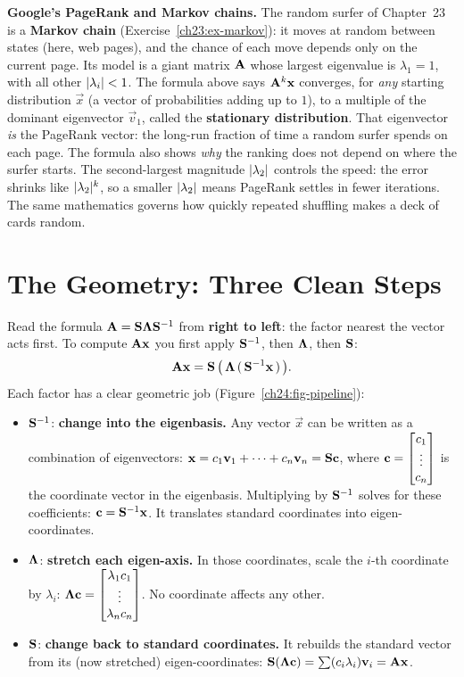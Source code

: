 \begin{applicationbox}
\textbf{Google's PageRank and Markov chains.} The random surfer of Chapter~23
is a \textbf{Markov chain} (Exercise~\ref{ch23:ex-markov}): it moves at random
between states (here, web pages), and the chance of each move depends only on the
current page. Its model is a giant matrix $\mathbf{A}$ whose largest eigenvalue is
$\lambda_1 = 1$, with all other $\lvert\lambda_i\rvert < 1$. The formula above says
$\mathbf{A}^k\mathbf{x}$ converges, for \emph{any} starting distribution $\vec{x}$
(a vector of probabilities adding up to $1$), to a multiple of the dominant
eigenvector $\vec{v}_1$, called the \textbf{stationary distribution}. That
eigenvector \emph{is} the PageRank vector: the long-run fraction of time a
random surfer spends on each page. The formula also shows \emph{why} the
ranking does not depend on where the surfer starts. The second-largest
magnitude $\lvert\lambda_2\rvert$ controls the speed: the error shrinks like
$\lvert\lambda_2\rvert^k$, so a smaller $\lvert\lambda_2\rvert$ means PageRank settles in
fewer iterations. The same mathematics governs how quickly repeated shuffling
makes a deck of cards random.
\end{applicationbox}

\section{The Geometry: Three Clean Steps}
\label{ch24:geometry}

Read the formula $\mathbf{A} = \mathbf{S}\mathbf{\Lambda}\mathbf{S}^{-1}$ from \textbf{right to
left}: the factor nearest the vector acts first. To compute $\mathbf{A}\mathbf{x}$ you
first apply $\mathbf{S}^{-1}$, then $\mathbf{\Lambda}$, then $\mathbf{S}$:
\[
  \mathbf{A}\mathbf{x}
  = \mathbf{S}\,\big(\,\mathbf{\Lambda}\,(\,\mathbf{S}^{-1}\mathbf{x}\,)\,\big).
\]
Each factor has a clear geometric job (Figure~\ref{ch24:fig-pipeline}):

\begin{itemize}
  \item $\mathbf{S}^{-1}$: \textbf{change into the eigenbasis.} Any vector $\vec{x}$
        can be written as a combination of eigenvectors:
        $\mathbf{x} = c_1\mathbf{v}_1 + \cdots + c_n\mathbf{v}_n = \mathbf{S}\mathbf{c}$,
        where $\mathbf{c} = \begin{bmatrix}c_1\\\vdots\\c_n\end{bmatrix}$ is the coordinate vector in
        the eigenbasis. Multiplying by $\mathbf{S}^{-1}$ solves for these coefficients:
        $\mathbf{c} = \mathbf{S}^{-1}\mathbf{x}$. It translates standard coordinates into
        eigen-coordinates.
  \item $\mathbf{\Lambda}$: \textbf{stretch each eigen-axis.} In those coordinates,
        scale the $i$-th coordinate by $\lambda_i$: $\mathbf{\Lambda}\mathbf{c} =
        \begin{bmatrix}\lambda_1 c_1\\\vdots\\\lambda_n c_n\end{bmatrix}$. No coordinate affects
        any other.
  \item $\mathbf{S}$: \textbf{change back to standard coordinates.} It rebuilds
        the standard vector from its (now stretched) eigen-coordinates:
        $\mathbf{S}(\mathbf{\Lambda}\mathbf{c}) = \sum (c_i\lambda_i)\mathbf{v}_i = \mathbf{A}\mathbf{x}$.
\end{itemize}

